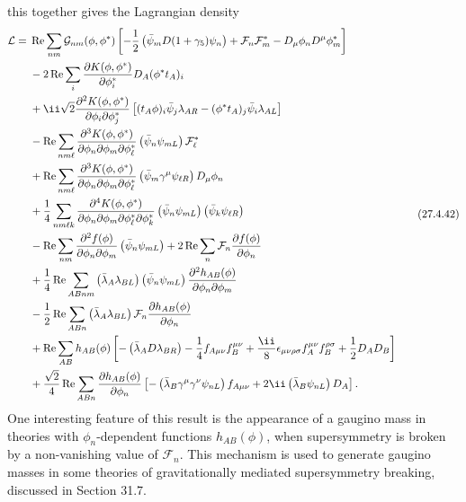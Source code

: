 this together gives the Lagrangian density
\begin{equation}
  \begin{aligned}
  \mathcal{L}={}&
  \operatorname{Re}\sum_{nm}\mathcal{G}_{nm}(\phi,\phi^*)
  \left[
    -\frac12\left(\bar\psi_m\sl{D}(1+\gamma_5)\psi_n\right)
    +\mathcal{F}_n\mathcal{F}_m^*
    -D_\mu\phi_nD^\mu\phi_m^*
  \right]
  \\
  &-2\operatorname{Re}\sum_i
    \frac{\partial K(\phi,\phi^*)}{\partial\phi_i^*}
    D_A(\phi^*t_A)_i
  \\
  &+\ii\sqrt{2}
    \frac{\partial^2K(\phi,\phi^*)}
         {\partial\phi_i\partial\phi_j^*}
    \left[
      (t_A\phi)_i\bar\psi_j\lambda_{AR}
      -(\phi^*t_A)_j\bar\psi_i\lambda_{AL}
    \right]
  \\
  &-\operatorname{Re}\sum_{nm\ell}
    \frac{\partial^3K(\phi,\phi^*)}
         {\partial\phi_n\partial\phi_m\partial\phi_\ell^*}
    \left(\bar\psi_n\psi_{mL}\right)\mathcal{F}_\ell^*
  \\
  &+\operatorname{Re}\sum_{nm\ell}
    \frac{\partial^3K(\phi,\phi^*)}
         {\partial\phi_n\partial\phi_m\partial\phi_\ell^*}
    \left(\bar\psi_m\gamma^\mu\psi_{\ell R}\right)D_\mu\phi_n
  \\
  &+\frac14\sum_{nm\ell k}
    \frac{\partial^4K(\phi,\phi^*)}
         {\partial\phi_n\partial\phi_m
          \partial\phi_\ell^*\partial\phi_k^*}
    \left(\bar\psi_n\psi_{mL}\right)
    \left(\bar\psi_k\psi_{\ell R}\right)
  \\
  &-\operatorname{Re}\sum_{nm}
    \frac{\partial^2f(\phi)}{\partial\phi_n\partial\phi_m}
    \left(\bar\psi_n\psi_{mL}\right)
  +2\operatorname{Re}\sum_n
    \mathcal{F}_n\frac{\partial f(\phi)}{\partial\phi_n}
  \\
  &+\frac14\operatorname{Re}\sum_{ABnm}
    \left(\bar\lambda_A\lambda_{BL}\right)
    \left(\bar\psi_n\psi_{mL}\right)
    \frac{\partial^2h_{AB}(\phi)}
         {\partial\phi_n\partial\phi_m}
  \\
  &-\frac12\operatorname{Re}\sum_{ABn}
    \left(\bar\lambda_A\lambda_{BL}\right)\mathcal{F}_n
    \frac{\partial h_{AB}(\phi)}{\partial\phi_n}
  \\
  &+\operatorname{Re}\sum_{AB}h_{AB}(\phi)
  \left[
    -\left(\bar\lambda_A\sl{D}\lambda_{BR}\right)
    -\frac14f_{A\mu\nu}f_B^{\mu\nu}
    +\frac{\ii}{8}\epsilon_{\mu\nu\rho\sigma}
      f_A^{\mu\nu}f_B^{\rho\sigma}
    +\frac12D_AD_B
  \right]
  \\
  &+\frac{\sqrt{2}}4\operatorname{Re}\sum_{ABn}
    \frac{\partial h_{AB}(\phi)}{\partial\phi_n}
    \left[
      -\left(\bar\lambda_B\gamma^\mu\gamma^\nu\psi_{nL}\right)
       f_{A\mu\nu}
      +2\ii\left(\bar\lambda_B\psi_{nL}\right)D_A
    \right].
  \end{aligned}
  \tag{27.4.42}\label{eq:27.4.42}
\end{equation}
One interesting feature of this result is the appearance of a gaugino mass
in theories with \(\phi_n\)-dependent functions \(h_{AB}(\phi)\), when
supersymmetry is broken by a non-vanishing value of \(\mathcal{F}_n\). This
mechanism is used to generate gaugino masses in some theories of
gravitationally mediated supersymmetry breaking, discussed in Section 31.7.
